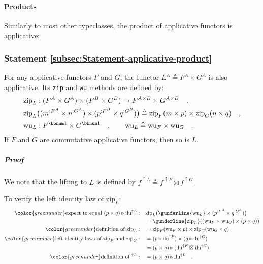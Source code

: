 \paragraph{Products}

Similarly to most other typeclasses, the product of applicative functors
is applicative:

\subsubsection{Statement \label{subsec:Statement-applicative-product}\ref{subsec:Statement-applicative-product}}

For any applicative functors $F$ and $G$, the functor $L^{A}\triangleq F^{A}\times G^{A}$
is also applicative. Its \lstinline!zip! and \lstinline!wu! methods
are defined by:
\begin{align*}
 & \text{zip}_{L}:(F^{A}\times G^{A})\times(F^{B}\times G^{B})\rightarrow F^{A\times B}\times G^{A\times B}\quad,\\
 & \text{zip}_{L}\big((m^{:F^{A}}\times n^{:G^{A}})\times(p^{:F^{B}}\times q^{:G^{B}})\big)\triangleq\text{zip}_{F}(m\times p)\times\text{zip}_{G}(n\times q)\quad,\\
 & \text{wu}_{L}:F^{\bbnum 1}\times G^{\bbnum 1}\quad,\quad\quad\text{wu}_{L}\triangleq\text{wu}_{F}\times\text{wu}_{G}\quad.
\end{align*}
If $F$ and $G$ are commutative applicative functors, then so is
$L$.

\subparagraph{Proof}

We note that the lifting to $L$ is defined by $f^{\uparrow L}\triangleq f^{\uparrow F}\boxtimes f^{\uparrow G}$.

To verify the left identity law of $\text{zip}_{L}$:
\begin{align*}
{\color{greenunder}\text{expect to equal }(p\times q)\triangleright\text{ilu}^{\uparrow L}:}\quad & \text{zip}_{L}\big(\gunderline{\text{wu}_{L}}\times(p^{:F^{A}}\times q^{:G^{A}})\big)\\
 & =\gunderline{\text{zip}_{L}}((\text{wu}_{F}\times\text{wu}_{G})\times(p\times q))\\
{\color{greenunder}\text{definition of }\text{zip}_{L}:}\quad & =\text{zip}_{F}(\text{wu}_{F}\times p)\times\text{zip}_{G}(\text{wu}_{G}\times q)\\
{\color{greenunder}\text{left identity laws of }\text{zip}_{F}\text{ and }\text{zip}_{G}:}\quad & =(p\triangleright\text{ilu}^{\uparrow F})\times(q\triangleright\text{ilu}^{\uparrow G})\\
 & =(p\times q)\triangleright(\text{ilu}^{\uparrow F}\boxtimes\text{ilu}^{\uparrow G})\\
{\color{greenunder}\text{definition of }^{\uparrow L}:}\quad & =(p\times q)\triangleright\text{ilu}^{\uparrow L}\quad.
\end{align*}

